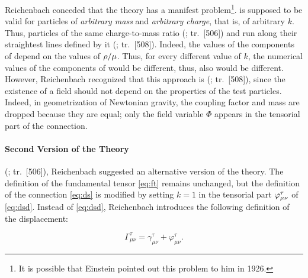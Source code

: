 \documentclass[final]{article}
\newcommand{\ctmr}{charge-to-mass ratio\xspace}
\newcommand{\ctmrd}{\ensuremath{\hfrac{\rho}{\mu}}\xspace}
\renewcommand{\rzlap}[2]{(\cite[#1]{Reichenbach1928}; tr.\ [#2])\xspace}
\begin{document}

Reichenbach conceded that the theory has a manifest problem\footnote{It is possible that Einstein pointed out this problem to him in 1926. }.  is supposed to be valid for particles of \emph{arbitrary mass} and \emph{arbitrary charge}, that is, of arbitrary $k$. Thus, particles of the same \ctmr {} \rzlap{362}{506} and run along their  straightest lines defined by it \rzlap{363}{508}. Indeed, the values of the components of \Gtmn depend on the values of \ctmrd. Thus, for every different value of $k$, the numerical values of the components of \Gtmn would be different, thus, also \ritea would be different. However, Reichenbach recognized that this approach is  \rzlap{363}{508}, since the existence of a field should not depend on the properties of the test particles. Indeed, in  geometrization of Newtonian gravity, the coupling factor and mass are dropped because they are equal; only the field variable $\Phi$ appears in the tensorial part of the connection.

\paragraph{Second Version of the Theory}
\label{RTt}

 \rzlap{367}{506}, Reichenbach suggested an alternative version of the theory. The definition of the fundamental tensor \cref{eq:ft} remains unchanged, but the definition of the connection \cref{eq:ds} is modified by setting $k=1$ in the tensorial part $\varphi^\tau_{\mu\nu}$ of \cref{eq:dsd}. Instead of \cref{eq:dsd}, Reichenbach introduces the following definition of the displacement:

\begin{equation*}
\Gamma_{\mu \nu}^{\tau}=\gamma_{\mu \nu}^{\tau}+\varphi_{\mu \nu}^{\tau}.
\end{equation*}
\end{document}
